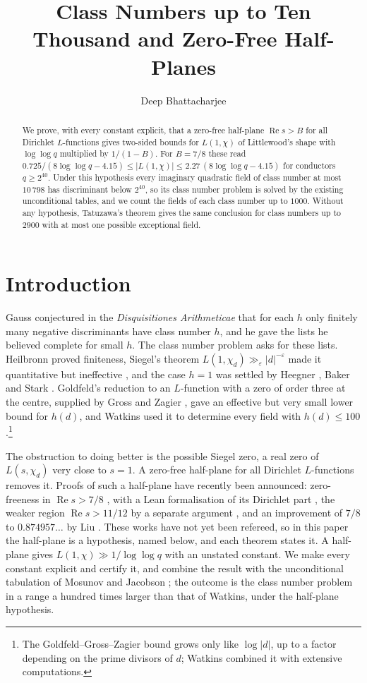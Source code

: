 \documentclass[11pt]{amsart}
\title{Class Numbers up to Ten Thousand and Zero-Free Half-Planes}
\author{Deep Bhattacharjee}
\theoremstyle{definition}
\theoremstyle{remark}
\renewcommand{\Re}{\operatorname{Re}}
\begin{document}
\begin{abstract}
We prove, with every constant explicit, that a zero-free half-plane $\Re s>B$ for all Dirichlet $L$-functions gives two-sided bounds for $L(1,\chi)$ of Littlewood's shape with $\log\log q$ multiplied by $1/(1-B)$. For $B=7/8$ these read $0.725/(8\log\log q-4.15)\le|L(1,\chi)|\le 2.27\,(8\log\log q-4.15)$ for conductors $q\ge 2^{40}$. Under this hypothesis every imaginary quadratic field of class number at most $10\,798$ has discriminant below $2^{40}$, so its class number problem is solved by the existing unconditional tables, and we count the fields of each class number up to $1000$. Without any hypothesis, Tatuzawa's theorem gives the same conclusion for class numbers up to $2900$ with at most one possible exceptional field.
\end{abstract}
\maketitle

\section{Introduction}

Gauss conjectured in the \emph{Disquisitiones Arithmeticae} that for each $h$ only finitely many negative discriminants have class number $h$, and he gave the lists he believed complete for small $h$. The class number problem asks for these lists. Heilbronn proved finiteness, Siegel's theorem $L(1,\chi_d)\gg_\varepsilon |d|^{-\varepsilon}$ made it quantitative but ineffective \cite{Sie35}, and the case $h=1$ was settled by Heegner \cite{Hee52}, Baker \cite{Bak66} and Stark \cite{Sta67}. Goldfeld's reduction \cite{Gol85} to an $L$-function with a zero of order three at the centre, supplied by Gross and Zagier \cite{GZ86}, gave an effective but very small lower bound for $h(d)$, and Watkins \cite{Wat04} used it to determine every field with $h(d)\le 100$.\footnote{The Goldfeld--Gross--Zagier bound grows only like $\log|d|$, up to a factor depending on the prime divisors of $d$; Watkins combined it with extensive computations.}

The obstruction to doing better is the possible Siegel zero, a real zero of $L(s,\chi_d)$ very close to $s=1$. A zero-free half-plane for all Dirichlet $L$-functions removes it. Proofs of such a half-plane have recently been announced: zero-freeness in $\Re s>7/8$ \cite{OAI-QRH}, with a Lean formalisation of its Dirichlet part \cite{OAI-family}, the weaker region $\Re s>11/12$ by a separate argument \cite{OAI-1112}, and an improvement of $7/8$ to $0.874957\ldots$ by Liu \cite{Liu26}. These works have not yet been refereed, so in this paper the half-plane is a hypothesis, named below, and each theorem states it. A half-plane gives $L(1,\chi)\gg 1/\log\log q$ with an unstated constant. We make every constant explicit and certify it, and combine the result with the unconditional tabulation of Mosunov and Jacobson \cite{MJ16}; the outcome is the class number problem in a range a hundred times larger than that of Watkins, under the half-plane hypothesis.
\end{document}
